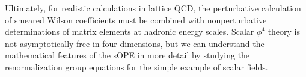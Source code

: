 Ultimately, for realistic calculations in lattice QCD, the 
perturbative 
calculation of smeared Wilson coefficients must be combined with 
nonperturbative determinations of matrix elements at hadronic energy 
scales. Scalar $\phi^4$ theory is not asymptotically free in four dimensions, 
but we can understand the mathematical features of the sOPE in more detail by 
studying the renormalization group equations for the simple example of 
scalar fields.
